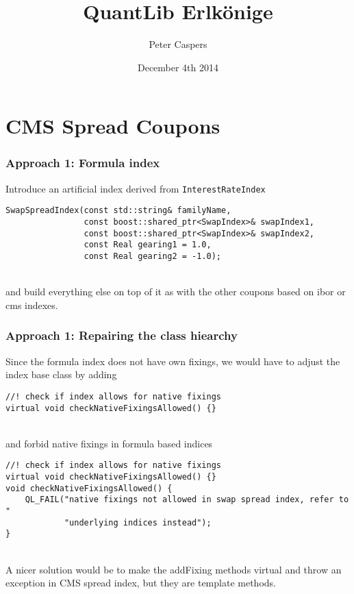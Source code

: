 \documentclass{beamer}
\begin{document}
\title{QuantLib Erlk\"onige}  
\author{Peter Caspers}
\date{December 4th 2014} 

\frame{\titlepage} 




\section{CMS Spread Coupons}


\begin{frame}[fragile]
\frametitle{Approach 1: Formula index}
Introduce an artificial index derived from \verb+InterestRateIndex+
\vspace{2mm}
\begin{verbatim}
SwapSpreadIndex(const std::string& familyName,
                const boost::shared_ptr<SwapIndex>& swapIndex1,
                const boost::shared_ptr<SwapIndex>& swapIndex2,
                const Real gearing1 = 1.0,
                const Real gearing2 = -1.0);
\end{verbatim}
\\
\vspace{2mm}
and build everything else on top of it as with the other coupons based
on ibor or cms indexes.
\end{frame}

\begin{frame}[fragile]
\frametitle{Approach 1: Repairing the class hiearchy}
Since the formula index does not have own fixings, we would have to
adjust the index base class by adding
\vspace{2mm}
\begin{verbatim}
//! check if index allows for native fixings
virtual void checkNativeFixingsAllowed() {}
\end{verbatim}
\\
\vspace{2mm}
and forbid native fixings in formula based indices
\vspace{2mm}
\begin{verbatim}
//! check if index allows for native fixings
virtual void checkNativeFixingsAllowed() {}
void checkNativeFixingsAllowed() {
    QL_FAIL("native fixings not allowed in swap spread index, refer to "
            "underlying indices instead");
}
\end{verbatim}
\\
\vspace{2mm}
A nicer solution would be to make the addFixing methods virtual and throw
an exception in CMS spread index, but they are template methods.
\end{frame}
\end{document}
